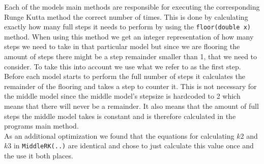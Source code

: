 Each of the models main methods are responsible for executing the corresponding Runge Kutta method the correct number of times. This is done by calculating exactly how many full steps it needs to perform by using the \texttt{floor(double x)} method. When using this method we get an integer representation of how many steps we need to take in that particular model but since we are flooring the amount of steps there might be a step remainder smaller than 1, that we need to consider. To take this into account we use what we refer to as the first step. Before each model starts to perform the full number of steps it calculates the remainder of the flooring and takes a step to counter it. 
This is not necessary for the middle model since the middle model's stepsize is hardcoded to 2 which means that there will never be a remainder. It also means that the amount of full steps the middle model takes is constant and is therefore calculated in the programs main method. \\

As an additional optimization we found that the equations for calculating $k2$ and $k3$ in \texttt{MiddleRK(..)} are identical and chose to just calculate this value once and the use it both places. 
